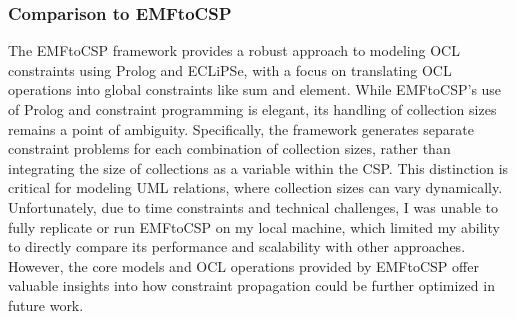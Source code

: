 
\subsubsection*{Comparison to EMFtoCSP}
The EMFtoCSP framework provides a robust approach to modeling OCL constraints using Prolog and ECLiPSe, with a focus on translating OCL operations into global constraints like sum and element. While EMFtoCSP’s use of Prolog and constraint programming is elegant, its handling of collection sizes remains a point of ambiguity. Specifically, the framework generates separate constraint problems for each combination of collection sizes, rather than integrating the size of collections as a variable within the CSP. This distinction is critical for modeling UML relations, where collection sizes can vary dynamically. Unfortunately, due to time constraints and technical challenges, I was unable to fully replicate or run EMFtoCSP on my local machine, which limited my ability to directly compare its performance and scalability with other approaches. However, the core models and OCL operations provided by EMFtoCSP offer valuable insights into how constraint propagation could be further optimized in future work.



